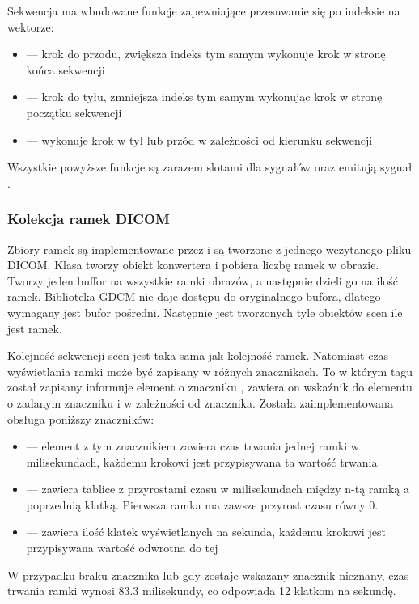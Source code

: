 \par
Sekwencja ma wbudowane funkcje zapewniające przesuwanie się po indeksie na wektorze:
\begin{itemize}
    \item {} --- krok do przodu, zwiększa indeks tym samym wykonuje krok w stronę końca sekwencji
    \item {} --- krok do tyłu, zmniejsza indeks tym samym wykonując krok w stronę początku sekwencji
    \item {} --- wykonuje krok w tył lub przód w zależności od kierunku sekwencji
\end{itemize}
Wszystkie powyższe funkcje są zarazem slotami dla sygnałów oraz emitują sygnał .

\subsubsection{Kolekcja ramek DICOM}
\label{sec:sokar-dicomframeset}

\par
Zbiory ramek są implementowane przez  i są tworzone z jednego wczytanego pliku DICOM.
Klasa tworzy obiekt konwertera i pobiera liczbę ramek w obrazie.
Tworzy jeden buffor na wszystkie ramki obrazów, a następnie dzieli go na ilość ramek.
Biblioteka GDCM nie daje dostępu do oryginalnego bufora, dlatego wymagany jest bufor pośredni.
Następnie jest tworzonych tyle obiektów scen ile jest ramek.
\par
Kolejność sekwencji scen jest taka sama jak kolejność ramek.
Natomiast czas wyświetlania ramki może być zapisany w różnych znacznikach.
To w którym tagu został zapisany informuje element o znaczniku , zawiera on wskaźnik do elementu o zadanym znaczniku i w zależności od znacznika.
Została zaimplementowana obsługa poniższy znaczników:
\begin{itemize}
    \item {} --- element z tym znacznikiem zawiera czas trwania jednej ramki w milisekundach, każdemu krokowi jest przypisywana ta wartość trwania

    \item {} --- zawiera tablice z przyrostami czasu w milisekundach między n-tą ramką a poprzednią klatką. Pierwsza ramka ma zawsze przyrost czasu równy 0.
    
    \item {} --- zawiera ilość klatek wyświetlanych na sekunda, każdemu krokowi jest przypisywana wartość odwrotna do tej
\end{itemize}
W przypadku braku znacznika lub gdy zostaje wskazany znacznik nieznany, czas trwania ramki wynosi $83.3$ milisekundy, co odpowiada 12 klatkom na sekundę.


